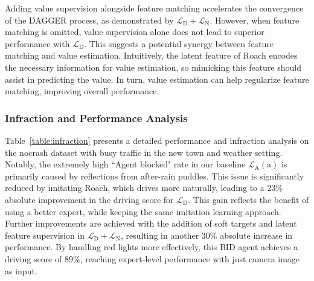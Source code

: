 %
Adding value supervision alongside feature matching accelerates the convergence of the DAGGER process, as demonstrated by $\mathcal{L}_\text{D} + \mathcal{L}_\text{N}$.
However, when feature matching is omitted, value supervision alone does not lead to superior performance with $\mathcal{L}_\text{D}$.
This suggests a potential synergy between feature matching and value estimation. 
Intuitively, the latent feature of Roach encodes the necessary information for value estimation, so mimicking this feature should assist in predicting the value. 
In turn, value estimation can help regularize feature matching, improving overall performance.


\subsubsection{Infraction and Performance Analysis}


\hspace{1pc}Table~\ref{table:infraction} presents a detailed performance and infraction analysis on the nocrash dataset with busy traffic in the new town and weather setting. 
Notably, the extremely high ``Agent blocked" rate in our baseline $\mathcal{L}_\text{A}(\text{a})$ is primarily caused by reflections from after-rain puddles. 
This issue is significantly reduced by imitating Roach, which drives more naturally, leading to a 23\% absolute improvement in the driving score for $\mathcal{L}_\text{D}$. 
This gain reflects the benefit of using a better expert, while keeping the same imitation learning approach. 
Further improvements are achieved with the addition of soft targets and latent feature supervision in $\mathcal{L}_\text{D}+\mathcal{L}_\text{N}$, resulting in another 30\% absolute increase in performance. 
By handling red lights more effectively, this BID agent achieves a driving score of 89\%, reaching expert-level performance with just camera image as input.





 